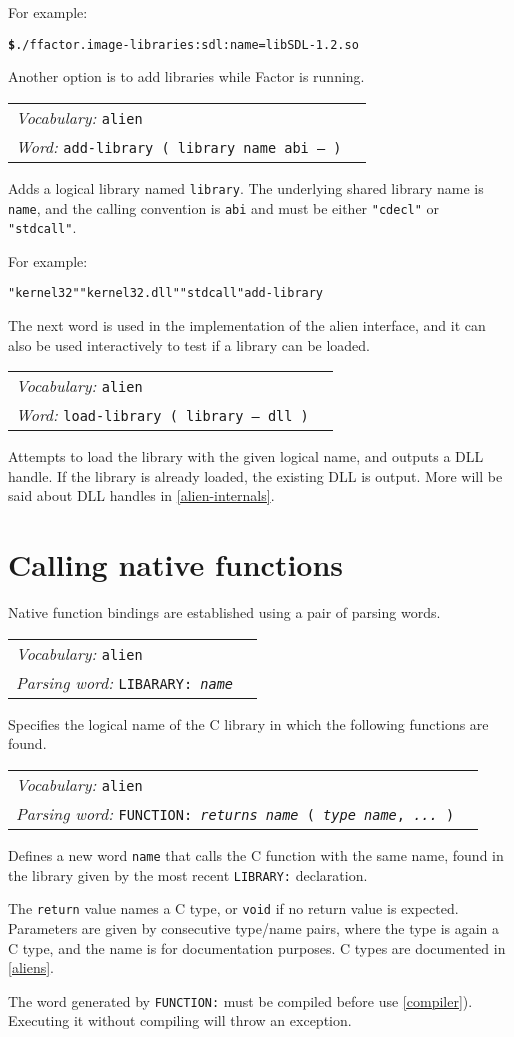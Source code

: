\documentclass{book}
\newcommand{\vocabulary}[1]{\emph{Vocabulary:} \texttt{#1}&\\}
\newcommand{\parsingword}[2]{\index{\texttt{#1}}\emph{Parsing word:} \texttt{#2}&\\}
\newcommand{\ordinaryword}[2]{\index{\texttt{#1}}\emph{Word:} \texttt{#2}&\\}
\newcommand{\wordtable}[1]{


\begin{tabularx}{12cm}{lX}
\hline
#1
\hline
\end{tabularx}

}
\begin{document}
For example:
\begin{alltt}
\textbf{\$} ./f factor.image -libraries:sdl:name=libSDL-1.2.so
\end{alltt}

Another option is to add libraries while Factor is running.
\wordtable{
\vocabulary{alien}
\ordinaryword{add-library}{add-library ( library name abi -- )}
}
Adds a logical library named \verb|library|. The underlying shared library name is \verb|name|, and the calling convention is \verb|abi| and must be either \verb|"cdecl"| or \verb|"stdcall"|.

For example:
\begin{alltt}
  "kernel32" "kernel32.dll"  "stdcall"  add-library
\end{alltt}
The next word is used in the implementation of the alien interface, and it can also be used
interactively to test if a library can be loaded.

\wordtable{
\vocabulary{alien}
\ordinaryword{load-library}{load-library ( library -- dll )}
}
Attempts to load the library with the given logical name, and outputs a DLL handle. If the library is already loaded, the existing DLL is output.
More will be said about DLL handles in \ref{alien-internals}.

\section{Calling native functions}

Native function bindings are established using a pair of parsing words.

\wordtable{
\vocabulary{alien}
\parsingword{LIBARARY:}{LIBARARY:~\emph{name}}
}
Specifies the logical name of the C library in which the following functions are found.

\wordtable{
\vocabulary{alien}
\parsingword{FUNCTION:}{FUNCTION:~\emph{returns} \emph{name} ( \emph{type} \emph{name}, \emph{...} )}
}
Defines a new word \verb|name| that calls the C function with the same name, found in the library given by the most recent \verb|LIBRARY:| declaration.

The \verb|return| value names a C type, or \verb|void| if no return value is expected.
Parameters are given by consecutive type/name pairs, where the type is again a C type, and the name is for documentation purposes. C types are documented in \ref{aliens}.

The word generated by \verb|FUNCTION:| must be compiled before use \ref{compiler}). Executing it without compiling will throw an exception.
\end{document}
